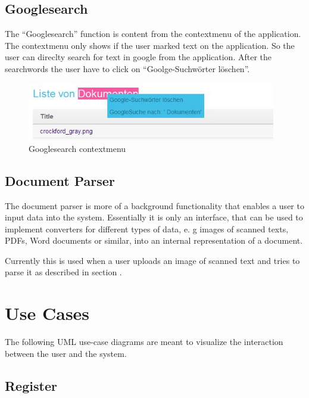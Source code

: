 \subsection{Googlesearch}

The \enquote{Googlesearch} function is content from the contextmenu of the application. The contextmenu only shows if 
the user marked text on the application. So the user can direclty search for text in google from the application. After 
the searchwords the user have to click on \enquote{Goolge-Suchwörter löschen}.

\begin{figure}[!ht]
  \centering
    \includegraphics[width=0.97\textwidth]{images/basic_functionalities/contextmenu.jpg}
  \caption{Googlesearch contextmenu}
  \label{fig:contextmenu}
\end{figure}

\subsection{Document Parser}

The document parser is more of a background functionality that enables a user to input data into the system. 
Essentially it is only an interface, that can be used to implement converters for different types of data, e. g images 
of scanned texts, PDFs, Word documents 
or similar, into an internal representation of a 
document.  

Currently this is used when a user uploads an image of scanned text and tries to parse it as described in section 
.

\section{Use Cases}

The following UML use-case diagrams are meant to visualize the interaction 
between the user and the system.

\subsection{Register}

